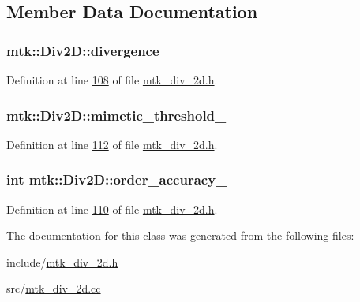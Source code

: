 \subsection{Member Data Documentation}
\hypertarget{classmtk_1_1Div2D_a354633b23820bc2dbdd643cd5f8d7561}{
\subsubsection[{divergence\+\_\+}]{ mtk\+::\+Div2\+D\+::divergence\+\_\+\hspace{0.3cm}{\ttfamily [private]}}}\label{classmtk_1_1Div2D_a354633b23820bc2dbdd643cd5f8d7561}


Definition at line \hyperlink{mtk__div__2d_8h_source_l00108}{108} of file \hyperlink{mtk__div__2d_8h_source}{mtk\+\_\+div\+\_\+2d.\+h}.

\hypertarget{classmtk_1_1Div2D_a3d1b25cc7275588221e78ade7f80ce25}{
\subsubsection[{mimetic\+\_\+threshold\+\_\+}]{ mtk\+::\+Div2\+D\+::mimetic\+\_\+threshold\+\_\+\hspace{0.3cm}{\ttfamily [private]}}}\label{classmtk_1_1Div2D_a3d1b25cc7275588221e78ade7f80ce25}


Definition at line \hyperlink{mtk__div__2d_8h_source_l00112}{112} of file \hyperlink{mtk__div__2d_8h_source}{mtk\+\_\+div\+\_\+2d.\+h}.

\hypertarget{classmtk_1_1Div2D_a8502e254d1642bfdff16766dcde83381}{
\subsubsection[{order\+\_\+accuracy\+\_\+}]{\setlength{\rightskip}{0pt plus 5cm}int mtk\+::\+Div2\+D\+::order\+\_\+accuracy\+\_\+\hspace{0.3cm}{\ttfamily [private]}}}\label{classmtk_1_1Div2D_a8502e254d1642bfdff16766dcde83381}


Definition at line \hyperlink{mtk__div__2d_8h_source_l00110}{110} of file \hyperlink{mtk__div__2d_8h_source}{mtk\+\_\+div\+\_\+2d.\+h}.



The documentation for this class was generated from the following files\+:\begin{DoxyCompactItemize}
\item 
include/\hyperlink{mtk__div__2d_8h}{mtk\+\_\+div\+\_\+2d.\+h}\item 
src/\hyperlink{mtk__div__2d_8cc}{mtk\+\_\+div\+\_\+2d.\+cc}\end{DoxyCompactItemize}
